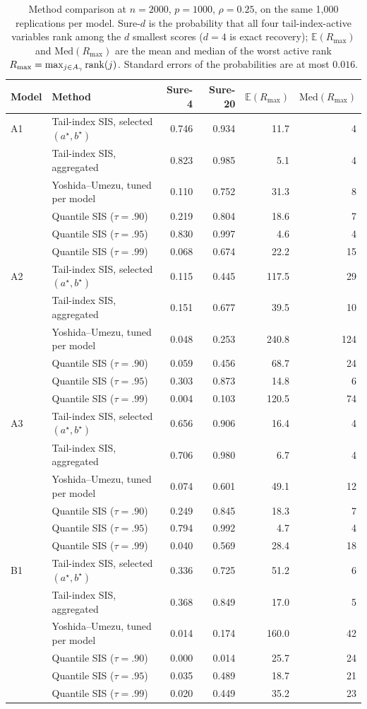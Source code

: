 \begin{table}[t]
\centering
\caption{Method comparison at $n=2000$, $p=1000$, $\rho=0.25$, on the same 1{,}000 replications per model. Sure-$d$ is the probability that all four tail-index-active variables rank among the $d$ smallest scores ($d=4$ is exact recovery); $\mathbb{E}(R_{\max})$ and $\mathrm{Med}(R_{\max})$ are the mean and median of the worst active rank $R_{\max}=\max_{j\in A_\gamma}\mathrm{rank}(j)$. Standard errors of the probabilities are at most $0.016$.}
\label{tab:cmp1000}
\begin{tabular}{llrrrr}
\toprule
Model & Method & Sure-4 & Sure-20 & $\mathbb{E}(R_{\max})$ & $\mathrm{Med}(R_{\max})$\\
\midrule
A1 & Tail-index SIS, selected $(a^\star,b^\star)$ & 0.746 & 0.934 & 11.7 & 4\\
 & Tail-index SIS, aggregated & 0.823 & 0.985 & 5.1 & 4\\
 & Yoshida--Umezu, tuned per model & 0.110 & 0.752 & 31.3 & 8\\
 & Quantile SIS ($\tau=.90$) & 0.219 & 0.804 & 18.6 & 7\\
 & Quantile SIS ($\tau=.95$) & 0.830 & 0.997 & 4.6 & 4\\
 & Quantile SIS ($\tau=.99$) & 0.068 & 0.674 & 22.2 & 15\\
\addlinespace
A2 & Tail-index SIS, selected $(a^\star,b^\star)$ & 0.115 & 0.445 & 117.5 & 29\\
 & Tail-index SIS, aggregated & 0.151 & 0.677 & 39.5 & 10\\
 & Yoshida--Umezu, tuned per model & 0.048 & 0.253 & 240.8 & 124\\
 & Quantile SIS ($\tau=.90$) & 0.059 & 0.456 & 68.7 & 24\\
 & Quantile SIS ($\tau=.95$) & 0.303 & 0.873 & 14.8 & 6\\
 & Quantile SIS ($\tau=.99$) & 0.004 & 0.103 & 120.5 & 74\\
\addlinespace
A3 & Tail-index SIS, selected $(a^\star,b^\star)$ & 0.656 & 0.906 & 16.4 & 4\\
 & Tail-index SIS, aggregated & 0.706 & 0.980 & 6.7 & 4\\
 & Yoshida--Umezu, tuned per model & 0.074 & 0.601 & 49.1 & 12\\
 & Quantile SIS ($\tau=.90$) & 0.249 & 0.845 & 18.3 & 7\\
 & Quantile SIS ($\tau=.95$) & 0.794 & 0.992 & 4.7 & 4\\
 & Quantile SIS ($\tau=.99$) & 0.040 & 0.569 & 28.4 & 18\\
\addlinespace
B1 & Tail-index SIS, selected $(a^\star,b^\star)$ & 0.336 & 0.725 & 51.2 & 6\\
 & Tail-index SIS, aggregated & 0.368 & 0.849 & 17.0 & 5\\
 & Yoshida--Umezu, tuned per model & 0.014 & 0.174 & 160.0 & 42\\
 & Quantile SIS ($\tau=.90$) & 0.000 & 0.014 & 25.7 & 24\\
 & Quantile SIS ($\tau=.95$) & 0.035 & 0.489 & 18.7 & 21\\
 & Quantile SIS ($\tau=.99$) & 0.020 & 0.449 & 35.2 & 23\\
\bottomrule
\end{tabular}
\end{table}
